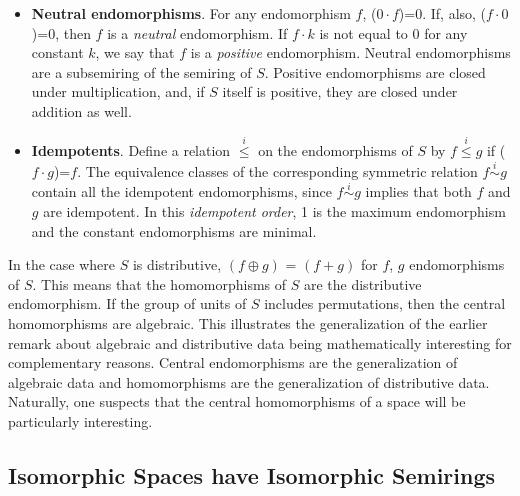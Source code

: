 \documentclass[11pt]{article}
\begin{document}
\begin{itemize}
\item{{\bf Neutral endomorphisms}.  For any endomorphism $f$, ($0\cdot f$)=$0$.  If, also, ($f\cdot 0$)=$0$, then $f$ is a {\it neutral} endomorphism. 
If $f\cdot k$ is not equal to $0$ for any constant $k$, we say that $f$ is a {\it positive} endomorphism. Neutral endomorphisms are a subsemiring of
the semiring of $S$.  Positive endomorphisms are closed under multiplication, and, if $S$ itself is positive, they are closed under addition as well.} 

\item{{\bf Idempotents}.  Define a relation ${\overset i \leq}$ on the endomorphisms of $S$ by $f{\overset i \leq}g$ if ($f\cdot g$)=$f$.  The equivalence 
classes of the corresponding symmetric relation $f{\overset i \sim} g$ contain all the idempotent endomorphisms, since $f{\overset i\sim}g$ implies that 
both $f$ and $g$ are idempotent.  In this {\it idempotent order}, 1 is the maximum endomorphism and the constant endomorphisms are minimal.}

\end{itemize} 
In the case where $S$ is distributive, $(f\oplus g)$ = $(f+g)$ for $f$, $g$ endomorphisms of $S$.  This means that the homomorphisms of $S$ are 
the distributive endomorphism.  If the group of units of $S$ includes permutations, then the central homomorphisms are algebraic.  This illustrates 
the generalization of the earlier remark about algebraic and distributive data being mathematically interesting for complementary reasons.  Central 
endomorphisms are the generalization of algebraic data and homomorphisms are the generalization of distributive data.  Naturally, one suspects 
that the central homomorphisms of a space will be particularly interesting. 

\subsection{Isomorphic Spaces have Isomorphic Semirings} 
\end{document}
